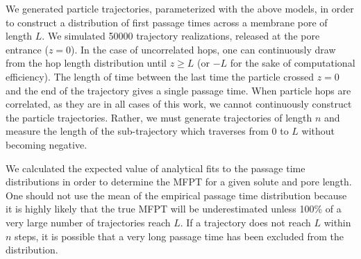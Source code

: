 \documentclass{article}
\begin{document}
  We generated particle trajectories, parameterized with the above models, in order
  to construct a distribution of first passage times across a membrane pore of length $L$.
  We simulated 50000 trajectory realizations, released at the pore entrance ($z=0$). In the case of 
  uncorrelated hops, one can continuously draw from the hop length distribution until 
  $z \geq L$ (or $-L$ for the sake of computational efficiency). The length of time 
  between the last time the particle crossed $z=0$ and the end of the trajectory gives a 
  single passage time. When particle hops are correlated, as they are in all cases of
  this work, we cannot continuously construct the particle trajectories. Rather, we must
  generate trajectories of length $n$ and measure the length of the sub-trajectory 
  which traverses from $0$ to $L$ without becoming negative.
  
  We calculated the expected value of analytical fits to the passage time distributions
  in order to determine the MFPT for a given solute and pore length. One should not 
  use the mean of the empirical passage time distribution because it is highly likely
  that the true MFPT will be underestimated unless 100\% of a very large number of 
  trajectories reach $L$. If a trajectory does not reach $L$ within $n$ steps, it is
  possible that a very long passage time has been excluded from the distribution.
  
  
\end{document}
